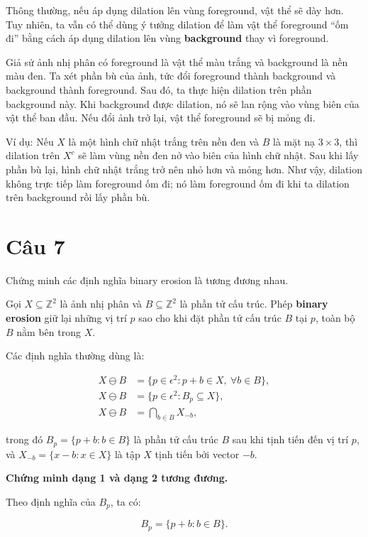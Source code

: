 Thông thường, nếu áp dụng dilation lên vùng foreground, vật thể sẽ dày hơn. Tuy nhiên, ta vẫn có thể dùng ý tưởng dilation để làm vật thể foreground ``ốm đi'' bằng cách áp dụng dilation lên vùng \textbf{background} thay vì foreground.

Giả sử ảnh nhị phân có foreground là vật thể màu trắng và background là nền màu đen. Ta xét phần bù của ảnh, tức đổi foreground thành background và background thành foreground. Sau đó, ta thực hiện dilation trên phần background này. Khi background được dilation, nó sẽ lan rộng vào vùng biên của vật thể ban đầu. Nếu đổi ảnh trở lại, vật thể foreground sẽ bị mỏng đi.

Ví dụ: Nếu $X$ là một hình chữ nhật trắng trên nền đen và $B$ là mặt nạ $3\times 3$, thì dilation trên $X^c$ sẽ làm vùng nền đen nở vào biên của hình chữ nhật. Sau khi lấy phần bù lại, hình chữ nhật trắng trở nên nhỏ hơn và mỏng hơn. Như vậy, dilation không trực tiếp làm foreground ốm đi; nó làm foreground ốm đi khi ta dilation trên background rồi lấy phần bù.

\section*{Câu 7}
Chứng minh các định nghĩa binary erosion là tương đương nhau.

Gọi $X \subseteq \mathbb{Z}^2$ là ảnh nhị phân và $B \subseteq \mathbb{Z}^2$ là phần tử cấu trúc. Phép \textbf{binary erosion} giữ lại những vị trí $p$ sao cho khi đặt phần tử cấu trúc $B$ tại $p$, toàn bộ $B$ nằm bên trong $X$.

Các định nghĩa thường dùng là:

\begin{align}
    X \ominus B
    &= \{p \in \epsilon^2 : p + b \in X,\ \forall b \in B\}, \\
    X \ominus B
    &= \{p \in \epsilon^2 : B_p \subseteq X\}, \\
    X \ominus B
    &= \bigcap_{b \in B} X_{-b},
\end{align}

trong đó $B_p=\{p+b:b\in B\}$ là phần tử cấu trúc $B$ sau khi tịnh tiến đến vị trí $p$, và $X_{-b}=\{x-b:x\in X\}$ là tập $X$ tịnh tiến bởi vector $-b$.

\textbf{Chứng minh dạng 1 và dạng 2 tương đương.}

Theo định nghĩa của $B_p$, ta có:

\begin{equation}
    B_p = \{p+b:b\in B\}.
\end{equation}

